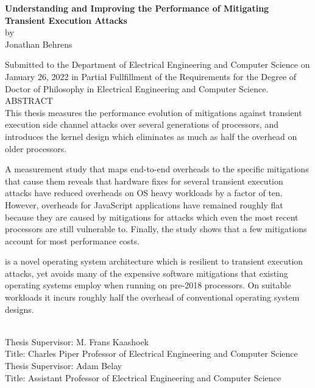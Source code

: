 
\singlespace
\begin{center}

{\large \bf Understanding and Improving the Performance of Mitigating Transient Execution Attacks} \\[.5\baselineskip]
by \\
Jonathan Behrens \\[.5\baselineskip]
\end{center}

Submitted to the Department of Electrical Engineering and Computer Science on January 26, 2022 in Partial Fullfillment of the Requirements for the Degree of Doctor of Philosophy in Electrical Engineering and Computer Science.\\[.5\baselineskip]

\noindent
ABSTRACT \\

This thesis measures the performance evolution of mitigations against transient execution side channel attacks over several generations of processors, and introduces the \sys kernel design which eliminates as much as half the overhead on older processors.

A measurement study that maps end-to-end overheads to the specific mitigations that cause them reveals that hardware fixes for several transient execution attacks have reduced overheads on OS heavy workloads by a factor of ten.
However, overheads for JavaScript applications have remained roughly flat because they are caused by mitigations for attacks which even the most recent processors are still vulnerable to.
Finally, the study shows that a few mitigations account for most performance costs.


\sys is a novel operating system architecture which is resilient to transient execution attacks, yet avoids many of the expensive software mitigations that existing operating systems employ when running on pre-2018 processors. 
On suitable workloads it incurs roughly half the overhead of conventional operating system designs.

~\\[\baselineskip]

\noindent
Thesis  Supervisor:  M.  Frans  Kaashoek \\
Title:  Charles  Piper  Professor  of Electrical  Engineering  and  Computer  Science \\[.5\baselineskip]
\noindent
Thesis  Supervisor:  Adam Belay \\
Title:  Assistant Professor  of Electrical  Engineering  and  Computer  Science \\

\doublespace